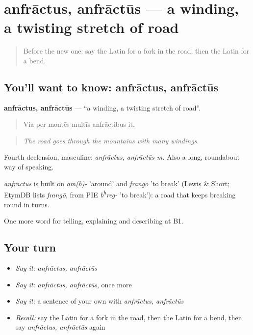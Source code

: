 \section[anfrāctus, anfrāctūs]{anfrāctus, anfrāctūs — a winding, a twisting stretch of road}

\label{lesson:LA-C424-anfractus}



\begin{quote}
Before the new one: say the Latin for a fork in the road, then the Latin for a bend.
\end{quote}

\subsection*{You'll want to know: anfrāctus, anfrāctūs}
\textbf{anfrāctus, anfrāctūs} — \textquotedblleft{}a winding, a twisting stretch of road\textquotedblright{}.

\begin{quote}
Via per montēs multīs anfrāctibus it.
\end{quote}

\begin{quote}
\emph{The road goes through the mountains with many windings.}
\end{quote}

Fourth declension, masculine: \emph{anfrāctus, anfrāctūs m.} Also a long, roundabout way of speaking.

\begin{cousinweb}
\emph{anfrāctus} is built on \emph{am(b)-} 'around' and \emph{frangō} 'to break' (Lewis \& Short; EtymDB lists \emph{frangō}, from PIE \emph{b\textsuperscript{h}reg-} 'to break'): a road that keeps breaking round in turns.
\end{cousinweb}

\begin{grammarlens}[title={What you've built}]
One more word for telling, explaining and describing at B1.
\end{grammarlens}

\subsection*{Your turn}
\begin{itemize}
\raggedright
  \item \emph{Say it:} \emph{anfrāctus, anfrāctūs}
  \item \emph{Say it:} \emph{anfrāctus, anfrāctūs}, once more
  \item \emph{Say it:} a sentence of your own with \emph{anfrāctus, anfrāctūs}
  \item \emph{Recall:} say the Latin for a fork in the road, then the Latin for a bend, then say \emph{anfrāctus, anfrāctūs} again
\end{itemize}

